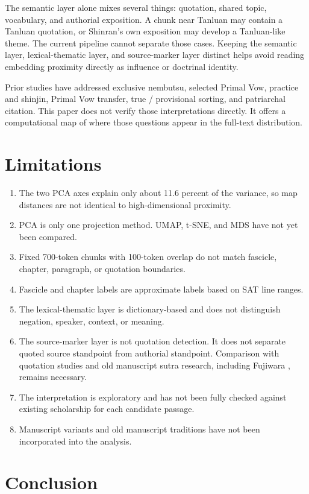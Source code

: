 \documentclass[uplatex,dvipdfmx,11pt,a4paper]{jsarticle}
\begin{document}
The semantic layer alone mixes several things: quotation, shared topic, vocabulary, and authorial exposition. A chunk near Tanluan may contain a Tanluan quotation, or Shinran's own exposition may develop a Tanluan-like theme. The current pipeline cannot separate those cases. Keeping the semantic layer, lexical-thematic layer, and source-marker layer distinct helps avoid reading embedding proximity directly as influence or doctrinal identity.

Prior studies have addressed exclusive nembutsu, selected Primal Vow, practice and shinjin, Primal Vow transfer, true / provisional sorting, and patriarchal citation. This paper does not verify those interpretations directly. It offers a computational map of where those questions appear in the full-text distribution.

\section{Limitations}

\begin{enumerate}
\item The two PCA axes explain only about 11.6 percent of the variance, so map distances are not identical to high-dimensional proximity.
\item PCA is only one projection method. UMAP, t-SNE, and MDS have not yet been compared.
\item Fixed 700-token chunks with 100-token overlap do not match fascicle, chapter, paragraph, or quotation boundaries.
\item Fascicle and chapter labels are approximate labels based on SAT line ranges.
\item The lexical-thematic layer is dictionary-based and does not distinguish negation, speaker, context, or meaning.
\item The source-marker layer is not quotation detection. It does not separate quoted source standpoint from authorial standpoint. Comparison with quotation studies and old manuscript sutra research, including Fujiwara \cite{fujiwara2020}, remains necessary.
\item The interpretation is exploratory and has not been fully checked against existing scholarship for each candidate passage.
\item Manuscript variants and old manuscript traditions have not been incorporated into the analysis.
\end{enumerate}

\section{Conclusion}
\end{document}

